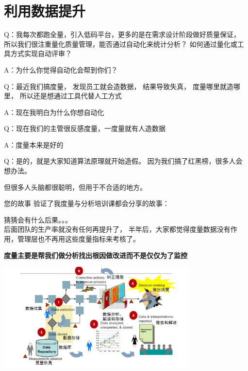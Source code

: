 \chapter{利用数据提升} %

Q：我每次都跑全量，引入低码平台，更多的是在需求设计阶段做好质量保证，
所以我们很注重量化质量管理，能否通过自动化来统计分析？
如何通过量化或工具方式实现自动评审？

A：为什么你觉得自动化会帮到你们？

Q：最近我们搞度量， 发现员工就会造数据， 结果导致失真，
度量哪里就造哪里， 所以还是想通过工具代替人工方式

A：现在我明白为什么你想自动化

Q：现在我们的主管很反感度量，一度量就有人造数据

A：度量本来是好的

Q：是的，就是大家知道算法原理就开始造假。
因为我们搞了红黑榜，很多人会想办法。

但很多人头脑都很聪明，但用于不合适的地方。

您的故事 验证了我度量与分析培训课都会分享的故事：


猜猜会有什么后果。。。\\
后面团队的生产率就没有任何再提升了，
半年后，大家都觉得度量数据没有作用，管理层也不再用这些度量指标来考核了。

\textbf{度量主要是帮我们做分析找出根因做改进而不是仅仅为了监控}

\includegraphics[width=10cm]{Ma4CarScreenshot_2021-12-27_205004.jpg}

